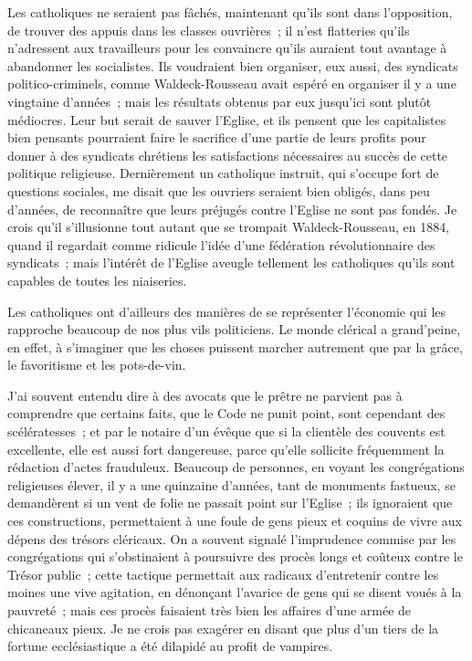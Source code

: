 \documentclass[french,twoside]{book} %
\begin{document}
\noindent Les catholiques ne seraient pas fâchés, maintenant qu’ils sont dans l’opposition, de trouver des appuis dans les classes ouvrières ; il n’est flatteries qu’ils n’adressent aux travailleurs pour les convaincre qu’ils auraient tout avantage à abandonner les socialistes. Ils voudraient bien organiser, eux aussi, des syndicats politico-criminels, comme Waldeck-Rousseau avait espéré en organiser il y a une vingtaine d’années ; mais les résultats obtenus par eux jusqu’ici sont plutôt médiocres. Leur but serait de sauver l’Eglise, et ils pensent que les capitalistes bien pensants pourraient faire le sacrifice d’une partie de leurs profits pour donner à des syndicats chrétiens les satisfactions nécessaires au succès de cette politique religieuse. Dernièrement un catholique instruit, qui s’occupe fort de questions sociales, me disait que les ouvriers seraient bien obligés, dans peu d’années, de reconnaître que leurs préjugés contre l’Eglise ne sont pas fondés. Je crois qu’il s’illusionne tout autant que se trompait Waldeck-Rousseau, en 1884, quand il regardait comme ridicule l’idée d’une fédération révolutionnaire des syndicats ; mais l’intérêt de l’Eglise aveugle tellement les catholiques qu’ils sont capables de toutes les niaiseries.\par
Les catholiques ont d’ailleurs des manières de se représenter l’économie qui les rapproche beaucoup de nos plus vils politiciens. Le monde clérical a grand’peine,  en effet, à s’imaginer que les choses puissent marcher autrement que par la grâce, le favoritisme et les pots-de-vin.\par
J’ai souvent entendu dire à des avocats que le prêtre ne parvient pas à comprendre que certains faits, que le Code ne punit point, sont cependant des scélératesses ; et par le notaire d’un évêque que si la clientèle des couvents est excellente, elle est aussi fort dangereuse, parce qu’elle sollicite fréquemment la rédaction d’actes frauduleux. Beaucoup de personnes, en voyant les congrégations religieuses élever, il y a une quinzaine d’années, tant de monuments fastueux, se demandèrent si un vent de folie ne passait point sur l’Eglise ; ils ignoraient que ces constructions, permettaient à une foule de gens pieux et coquins de vivre aux dépens des trésors cléricaux. On a souvent signalé l’imprudence commise par les congrégations qui s’obstinaient à poursuivre des procès longs et coûteux contre le Trésor public ; cette tactique permettait aux radicaux d’entretenir contre les moines une vive agitation, en dénonçant l’avarice de gens qui se disent voués à la pauvreté ; mais ces procès faisaient très bien les affaires d’une armée de chicaneaux pieux. Je ne crois pas exagérer en disant que plus d’un tiers de la fortune ecclésiastique a été dilapidé au profit de vampires.\par
\end{document}
